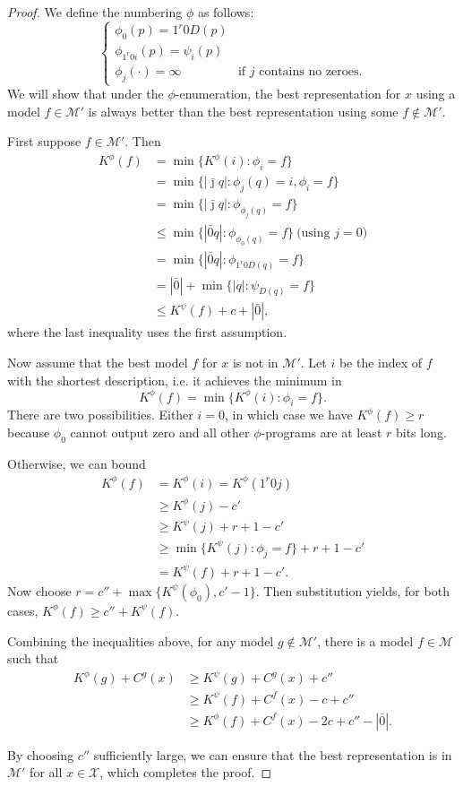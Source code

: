 \documentclass{style/llncs}
\newcommand{\M}{\mathscr M}
\newcommand{\X}{\mathscr X}
\begin{document}
\begin{proof}
We define the numbering $\phi$ as follows:
\[\begin{cases}
\phi_0(p) = 1^r 0 D(p) \\
\phi_{1^r0i}(p) = \psi_i(p) \\
\phi_j(\cdot) = \infty &\text{if $j$ contains no zeroes.}
\end{cases}\]
We will show that under the $\phi$-enumeration, the best representation for $x$ using a model $f\in\M'$ is always better than the best representation using some $f\not\in\M'$.

First suppose $f\in\M'$. Then
\[\begin{split}
K^\phi(f)&=\min\{K^\phi(i):\phi_i=f\}\\
&=\min\{|\bar\jmath q|:\phi_j(q)=i, \phi_i=f\}\\
&=\min\{|\bar\jmath q|:\phi_{\phi_j(q)}=f\}\\
&\le\min\{|\bar0 q|:\phi_{\phi_0(q)}=f\}~\text{(using $j=0$)}\\
&=\min\{|\bar0 q|:\phi_{1^r0 D(q)}=f\}\\
&=|\bar 0|+\min\{|q|:\psi_{D(q)}=f\}\\
&\le K^\psi(f)+c+|\bar 0|,
\end{split}
\]
where the last inequality uses the first assumption.


Now assume that the best model $f$ for $x$ is not in $\M'$. 
Let $i$ be the index of $f$ with the shortest description, i.e. it achieves the minimum in
\[
K^\phi(f)=\min\{K^\phi(i):\phi_i=f\}.
\]
There are two possibilities. Either $i=0$, in which case we have $K^\phi(f)\ge r$ because $\phi_0$ cannot output zero and all other $\phi$-programs are at least $r$ bits long.

Otherwise, we can bound
\[\begin{split}
K^\phi(f)&=K^\phi(i)=K^\phi(1^r0j)\\
&\ge K^\phi(j)-c'\\
&\ge K^\psi(j)+r+1-c'\\
&\ge\min\{K^\psi(j):\phi_j=f\}+r+1-c'\\
&=K^\psi(f)+r+1-c'.
\end{split}
\]
Now choose $r=c''+\max\{K^\psi(\phi_0),c'-1\}$. Then substitution yields, for both cases, 
$K^\phi(f)\ge c''+K^\psi(f)$.

Combining the inequalities above, for any model $g\not\in\M'$, there is a model $f\in\M$ such that
\[\begin{split}
K^\phi(g)+C^g(x) &\ge K^\psi(g)+C^g(x)+c''\\
&\ge K^\psi(f)+C^f(x)-c+c''\\
&\ge K^\phi(f)+C^f(x) -2c+c'' -|\bar0|.
\end{split}\]

By choosing $c''$ sufficiently large, we can ensure that the best representation is in $\M'$ for all $x\in\X$, which completes the proof.
\end{proof}
\end{document}
